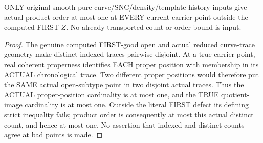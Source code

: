 \begin{lemma}
\label{hir:sharp-original-curve-first-good-product-order-le-one}
\leanok
ONLY original smooth pure curve/SNC/density/template-history inputs give
actual product order at most one at EVERY current carrier point outside
the computed FIRST $Z$. No already-transported count or order bound is
input.
\end{lemma}
\begin{proof}
The genuine computed FIRST-good open and actual reduced curve-trace
geometry make distinct indexed traces pairwise disjoint. At a true
carrier point, real coherent properness identifies EACH proper position
with membership in its ACTUAL chronological trace. Two different proper
positions would therefore put the SAME actual open-subtype point in two
disjoint actual traces. Thus the ACTUAL proper-position cardinality is at
most one, and the TRUE quotient-image cardinality is at most one. Outside
the literal FIRST defect its defining strict inequality fails; product
order is consequently at most this actual distinct count, and hence at
most one. No assertion that indexed and distinct counts agree at bad
points is made.
\end{proof}

